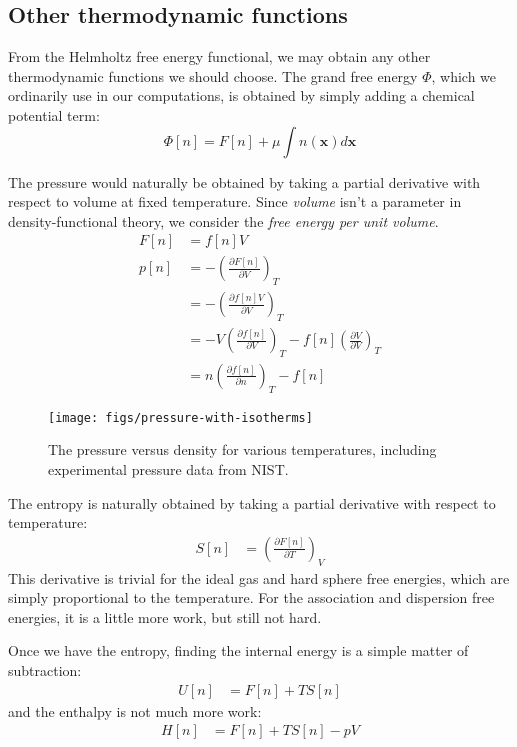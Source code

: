 \documentclass[letterpaper,twocolumn,amsmath,amssymb,prb]{revtex4-1}
\newcommand{\xx}{\textbf{x}}
\begin{document}
\subsection{Other thermodynamic functions}

From the Helmholtz free energy functional, we may obtain any other
thermodynamic functions we should choose.  The grand free energy
$\Phi$, which we ordinarily use in our computations, is obtained by
simply adding a chemical potential term:
\begin{equation}
  \Phi[n] = F[n] + \mu \int n(\xx) d\xx
\end{equation}

The pressure would naturally be obtained by taking a partial
derivative with respect to volume at fixed temperature.  Since
\emph{volume} isn't a parameter in density-functional theory, we
consider the \emph{free energy per unit volume}.
\begin{align}
  F[n] &= f[n]V \\
  p[n] &= -\left(\frac{\partial F[n]}{\partial V}\right)_{T} \\
  &= -\left(\frac{\partial f[n]V}{\partial V}\right)_{T} \\
  &= -V\left(\frac{\partial f[n]}{\partial V}\right)_{T}
   - f[n]\left(\frac{\partial V}{\partial V}\right)_{T} \\
  &= n \left(\frac{\partial f[n]}{\partial n}\right)_{T} - f[n]
\end{align}

\begin{figure}
\begin{center}
\texttt{[image: figs/pressure-with-isotherms]}
\end{center}
\caption{The pressure versus density for various temperatures, including experimental pressure data from NIST.  }
\label{fig:pressure-with-isotherms}
\end{figure}

The entropy is naturally obtained by taking a partial derivative with
respect to temperature:
\begin{align}
  S[n] &= \left(\frac{\partial F[n]}{\partial T}\right)_{V}
\end{align}
This derivative is trivial for the ideal gas and hard sphere free
energies, which are simply proportional to the temperature.  For the
association and dispersion free energies, it is a little more work,
but still not hard.

Once we have the entropy, finding the internal energy is a simple
matter of subtraction:
\begin{align}
  U[n] &= F[n] + TS[n]
\end{align}
and the enthalpy is not much more work:
\begin{align}
  H[n] &= F[n] + TS[n] - pV
\end{align}
\end{document}
